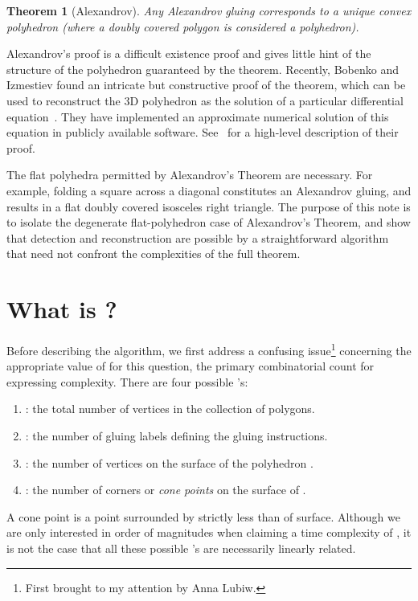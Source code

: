 \pdfoutput=1  \documentclass[]{article}
\newtheorem{theorem}{{\bf Theorem}}
\newcommand{\seclab}[1]{\label{sec:#1}}
\newcommand{\squeezelist}{\setlength{\itemsep}{0pt}}
\begin{document}
\begin{theorem}[Alexandrov]
Any Alexandrov gluing corresponds to a unique convex polyhedron
(where a doubly covered polygon is considered a polyhedron).
\end{theorem}

Alexandrov's proof is a difficult existence proof and gives little hint of the
structure
of the polyhedron guaranteed by the theorem.
Recently, Bobenko and Izmestiev found an intricate but constructive proof of
the theorem, which can be used to reconstruct the 3D polyhedron as the
solution of a  particular differential equation~\cite{bi-atwdt-06}.
They have implemented an approximate numerical solution of this equation
in publicly available software.
See~\cite{o-cgc49-07} for a high-level description of their proof.

The flat polyhedra permitted by Alexandrov's Theorem are
necessary.  For example, folding a square across a diagonal
constitutes an Alexandrov gluing, and results in a flat
doubly covered isosceles right triangle.
The purpose of this note is to isolate the degenerate flat-polyhedron
case of Alexandrov's Theorem, and show that detection and
reconstruction
are possible by a straightforward algorithm that need not
confront the complexities of the full theorem.


\section{What is ?}
\seclab{WhatIsN}
Before describing the algorithm, we first address a confusing issue\footnote{
First brought to my attention by Anna Lubiw.} 
concerning
the appropriate value of  for this question, the primary combinatorial count for
expressing complexity.
There are four possible 's:
\begin{enumerate}
\squeezelist
\item : the total number of vertices in the collection of polygons.
\item : the number of gluing labels defining the gluing instructions.
\item : the number of vertices on the surface of the polyhedron .
\item : the number of corners or \emph{cone points} on the surface of .
\end{enumerate}
A cone point is a point surrounded by strictly less than  of surface.
Although we are only interested in order of magnitudes when claiming
a time complexity of , it is not the case that all these possible 's
are necessarily linearly related.
\end{document}
